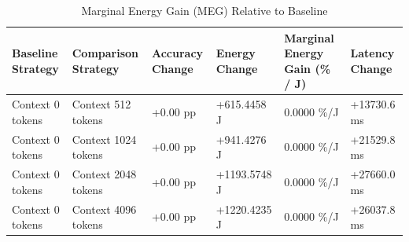 \begin{table}
\caption{Marginal Energy Gain (MEG) Relative to Baseline}
\label{tab:marginal_energy_gain}
\begin{tabular}{llllll}
\toprule
Baseline Strategy & Comparison Strategy & Accuracy Change & Energy Change & Marginal Energy Gain (\% / J) & Latency Change \\
\midrule
Context 0 tokens & Context 512 tokens & +0.00 pp & +615.4458 J & 0.0000 \%/J & +13730.6 ms \\
Context 0 tokens & Context 1024 tokens & +0.00 pp & +941.4276 J & 0.0000 \%/J & +21529.8 ms \\
Context 0 tokens & Context 2048 tokens & +0.00 pp & +1193.5748 J & 0.0000 \%/J & +27660.0 ms \\
Context 0 tokens & Context 4096 tokens & +0.00 pp & +1220.4235 J & 0.0000 \%/J & +26037.8 ms \\
\bottomrule
\end{tabular}
\end{table}
